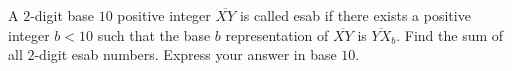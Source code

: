 A $2$-digit base $10$ positive integer $\overline{XY}$ is called esab if there exists a positive integer $b<10$ such that the base $b$ representation of $\overline{XY}$ is $\overline{YX}_b$. Find the sum of all $2$-digit esab numbers. Express your answer in base $10$.
